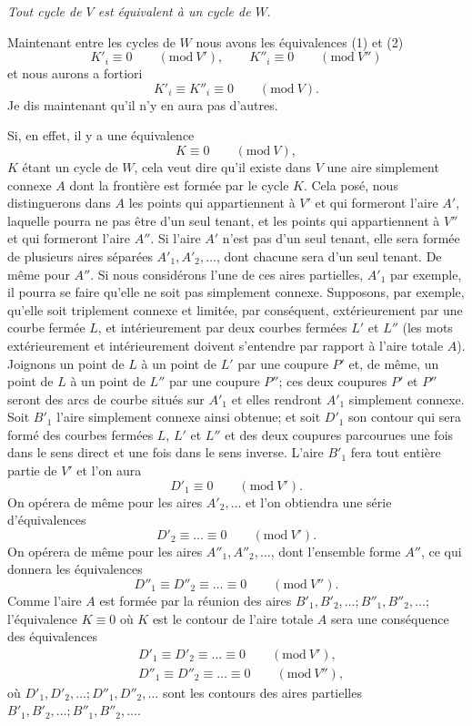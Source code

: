 \documentclass{article}
\begin{document}
\emph{Tout cycle de $V$ est équivalent à un cycle de $W$}.

Maintenant entre les cycles de $W$ nous avons les équivalences (1) et (2)
\[ K'_{i} \equiv 0 \qquad (\text{mod}\ V'), \qquad K''_{i} \equiv 0 \qquad (\text{mod}\ V'') \]
et nous aurons a fortiori
\[ K'_{i} \equiv K''_{i} \equiv 0 \qquad (\text{mod}\ V). \tag{3} \]
Je dis maintenant qu'il n'y en aura pas d'autres.

Si, en effet, il y a une équivalence
\[ K \equiv 0 \qquad (\text{mod}\ V), \]
$K$ étant un cycle de $W$, cela veut dire qu'il existe dans $V$ une aire simplement connexe $A$ dont la frontière est formée par le cycle $K$. Cela posé, nous distinguerons dans $A$ les points qui appartiennent à $V'$ et qui formeront l'aire $A'$, laquelle pourra ne pas être d'un seul tenant, et les points qui appartiennent à $V''$ et qui formeront l'aire $A''$. Si l'aire $A'$ n'est pas d'un seul tenant, elle sera formée de plusieurs aires séparées $A'_{1}, A'_{2}, \ldots$, dont chacune sera d'un seul tenant. De même pour $A''$. Si nous considérons l'une de ces aires partielles, $A'_{1}$ par exemple, il pourra se faire qu'elle ne soit pas simplement connexe. Supposons, par exemple, qu'elle soit triplement connexe et limitée, par conséquent, extérieurement par une courbe fermée $L$, et intérieurement par deux courbes fermées $L'$ et $L''$ (les mots extérieurement et intérieurement doivent s'entendre par rapport à l'aire totale $A$). Joignons un point de $L$ à un point de $L'$ par une coupure $P'$ et, de même, un point de $L$ à un point de $L''$ par une coupure $P''$; ces deux coupures $P'$ et $P''$ seront des arcs de courbe situés sur $A'_{1}$ et elles rendront $A'_{1}$ simplement connexe. Soit $B'_{1}$ l'aire simplement connexe ainsi obtenue; et soit $D'_{1}$ son contour qui sera formé des courbes fermées $L$, $L'$ et $L''$ et des deux coupures parcourues une fois dans le sens direct et une fois dans le sens inverse. L'aire $B'_{1}$ fera tout entière partie de $V'$ et l'on aura
\[ D'_{1} \equiv 0 \qquad (\text{mod}\ V'). \]
On opérera de même pour les aires $A'_{2}, \ldots$ et l'on obtiendra une série d'équivalences
\[ D'_{2} \equiv \ldots \equiv 0 \qquad (\text{mod}\ V'). \]
On opérera de même pour les aires $A''_{1}, A''_{2}, \ldots$, dont l'ensemble forme $A''$, ce qui donnera les équivalences
\[ D''_{1} \equiv D''_{2} \equiv \ldots \equiv 0 \qquad (\text{mod}\ V''). \]
Comme l'aire $A$ est formée par la réunion des aires $B'_{1}, B'_{2}, \ldots; B''_{1}, B''_{2}, \ldots$; l'équivalence $K \equiv 0$ où $K$ est le contour de l'aire totale $A$ sera une conséquence des équivalences
\[ \begin{aligned} &D'_{1} \equiv D'_{2} \equiv \ldots \equiv 0 \qquad (\text{mod}\ V'),\\ &D''_{1} \equiv D''_{2} \equiv \ldots \equiv 0 \qquad (\text{mod}\ V''), \end{aligned} \]
où $D'_{1}, D'_{2}, \ldots; D''_{1}, D''_{2}, \ldots$ sont les contours des aires partielles $B'_{1}, B'_{2}, \ldots; B''_{1}, B''_{2}, \ldots$.
\end{document}
